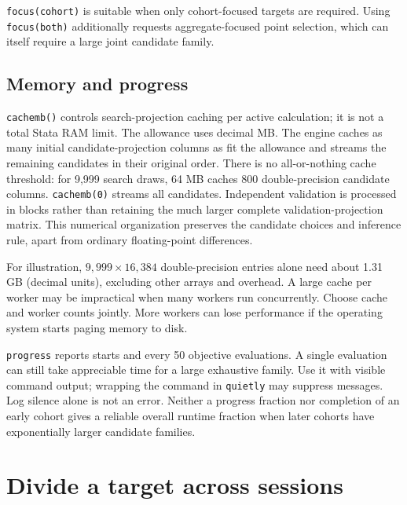 \documentclass[11pt]{article}
\newcommand{\cmd}[1]{\texttt{#1}}
\begin{document}
\cmd{focus(cohort)} is suitable when only cohort-focused targets are required.
Using \cmd{focus(both)} additionally requests aggregate-focused point selection,
which can itself require a large joint candidate family.

\subsection{Memory and progress}
\cmd{cachemb()} controls search-projection caching per active calculation;
it is not a total Stata RAM limit. The allowance uses decimal MB. The engine
caches as many initial candidate-projection columns as fit the allowance and
streams the remaining candidates in their original order. There is no
all-or-nothing cache threshold: for 9,999 search draws, 64 MB caches 800
double-precision candidate columns. \cmd{cachemb(0)} streams all candidates.
Independent validation is processed in blocks rather than retaining the much
larger complete validation-projection matrix. This numerical organization
preserves the candidate choices and inference rule, apart from ordinary
floating-point differences.

For illustration, $9{,}999\times16{,}384$ double-precision entries alone need
about 1.31 GB (decimal units), excluding other arrays and overhead. A large
cache per worker may be impractical when many workers run concurrently.
Choose cache and worker counts jointly. More workers can lose performance if
the operating system starts paging memory to disk.

\cmd{progress} reports starts and every 50 objective evaluations. A single
evaluation can still take appreciable time for a large exhaustive family. Use it with
visible command output; wrapping the command in \cmd{quietly} may suppress
messages. Log silence alone is not an error. Neither a progress fraction nor
completion of an early cohort gives a reliable overall runtime fraction when
later cohorts have exponentially larger candidate families.

\section{Divide a target across sessions}
\end{document}
